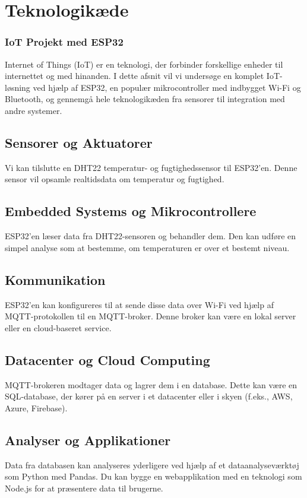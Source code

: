 \section{Teknologikæde}
\subsubsection*{IoT Projekt med ESP32}
Internet of Things (IoT) er en teknologi, der forbinder forskellige enheder til internettet og med hinanden. I dette afsnit vil vi undersøge en komplet IoT-løsning ved hjælp af ESP32, en populær mikrocontroller med indbygget Wi-Fi og Bluetooth, og gennemgå hele teknologikæden fra sensorer til integration med andre systemer.

\subsection*{Sensorer og Aktuatorer}
Vi kan tilslutte en DHT22 temperatur- og fugtighedssensor til ESP32'en. Denne sensor vil opsamle realtidsdata om temperatur og fugtighed.

\subsection*{Embedded Systems og Mikrocontrollere}
ESP32'en læser data fra DHT22-sensoren og behandler dem. Den kan udføre en simpel analyse som at bestemme, om temperaturen er over et bestemt niveau.

\subsection*{Kommunikation}
ESP32'en kan konfigureres til at sende disse data over Wi-Fi ved hjælp af MQTT-protokollen til en MQTT-broker. Denne broker kan være en lokal server eller en cloud-baseret service.

\subsection*{Datacenter og Cloud Computing}
MQTT-brokeren modtager data og lagrer dem i en database. Dette kan være en SQL-database, der kører på en server i et datacenter eller i skyen (f.eks., AWS, Azure, Firebase).

\subsection*{Analyser og Applikationer}
Data fra databasen kan analyseres yderligere ved hjælp af et dataanalyseværktøj som Python med Pandas. Du kan bygge en webapplikation med en teknologi som Node.js for at præsentere data til brugerne.

